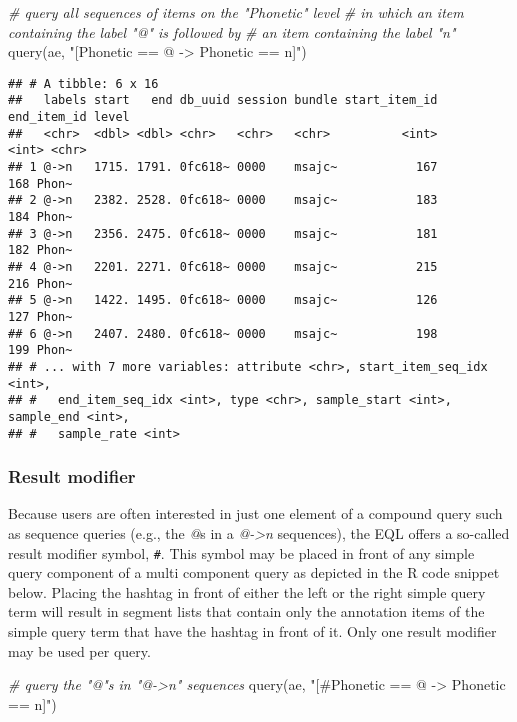 \documentclass[
]{book}
\newenvironment{Shaded}{\begin{snugshade}}{\end{snugshade}}
\newcommand{\CommentTok}[1]{\textcolor[rgb]{0.56,0.35,0.01}{\textit{#1}}}
\newcommand{\FunctionTok}[1]{\textcolor[rgb]{0.00,0.00,0.00}{#1}}
\newcommand{\NormalTok}[1]{#1}
\newcommand{\StringTok}[1]{\textcolor[rgb]{0.31,0.60,0.02}{#1}}
\begin{document}
\begin{Shaded}
\begin{Highlighting}[]
\CommentTok{\# query all sequences of items on the "Phonetic" level}
\CommentTok{\# in which an item containing the label "@" is followed by}
\CommentTok{\# an item containing the label "n"}
\FunctionTok{query}\NormalTok{(ae, }\StringTok{"[Phonetic == @ {-}\textgreater{} Phonetic == n]"}\NormalTok{)}
\end{Highlighting}
\end{Shaded}

\begin{verbatim}
## # A tibble: 6 x 16
##   labels start   end db_uuid session bundle start_item_id end_item_id level
##   <chr>  <dbl> <dbl> <chr>   <chr>   <chr>          <int>       <int> <chr>
## 1 @->n   1715. 1791. 0fc618~ 0000    msajc~           167         168 Phon~
## 2 @->n   2382. 2528. 0fc618~ 0000    msajc~           183         184 Phon~
## 3 @->n   2356. 2475. 0fc618~ 0000    msajc~           181         182 Phon~
## 4 @->n   2201. 2271. 0fc618~ 0000    msajc~           215         216 Phon~
## 5 @->n   1422. 1495. 0fc618~ 0000    msajc~           126         127 Phon~
## 6 @->n   2407. 2480. 0fc618~ 0000    msajc~           198         199 Phon~
## # ... with 7 more variables: attribute <chr>, start_item_seq_idx <int>,
## #   end_item_seq_idx <int>, type <chr>, sample_start <int>, sample_end <int>,
## #   sample_rate <int>
\end{verbatim}

\hypertarget{result-modifier}{%
\subsubsection{Result modifier}\label{result-modifier}}

Because users are often interested in just one element of a compound query such as sequence queries (e.g., the \emph{@}s in a \emph{@-\textgreater n} sequences), the EQL offers a so-called result modifier symbol, \texttt{\#}. This symbol may be placed in front of any simple query component of a multi component query as depicted in the R code snippet below. Placing the hashtag in front of either the left or the right simple query term will result in segment lists that contain only the annotation items of the simple query term that have the hashtag in front of it. Only one result modifier may be used per query.

\begin{Shaded}
\begin{Highlighting}[]
\CommentTok{\# query the "@"s in "@{-}\textgreater{}n" sequences}
\FunctionTok{query}\NormalTok{(ae, }\StringTok{"[\#Phonetic == @ {-}\textgreater{} Phonetic == n]"}\NormalTok{)}
\end{Highlighting}
\end{Shaded}
\end{document}
